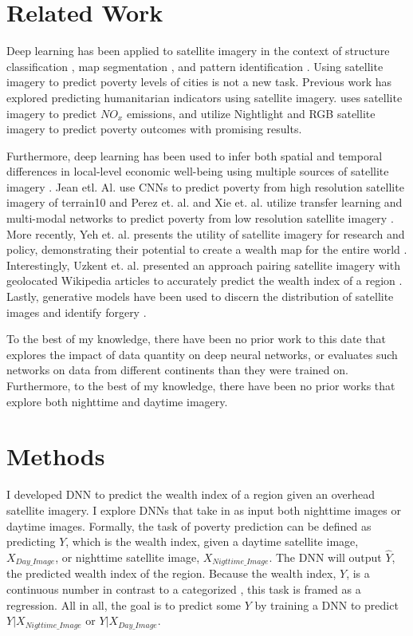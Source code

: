 \documentclass{article}
\begin{document}
\section{Related Work}

Deep learning has been applied to satellite imagery in the context of structure classification \cite{xia2018dota}, map segmentation \cite{wang2015deep} \cite{audebert2017joint}, and pattern identification \cite{albert2017using}. Using satellite imagery to predict poverty levels of cities is not a new task. Previous work has explored predicting humanitarian indicators using satellite imagery. \cite{kim2006satellite} uses satellite imagery to predict $NO_x$ emissions, and \cite{wang2012poverty} \cite{Jean790} \cite{nips_2017_workshop_stefano} utilize Nightlight and RGB satellite imagery to predict poverty outcomes with promising results.

Furthermore, deep learning has been used to infer both spatial and temporal differences in local-level economic well-being using multiple sources of satellite imagery \cite{three}. Jean etl. Al. use CNNs to predict poverty from high resolution satellite imagery of terrain10 and Perez et. al. and Xie et. al. utilize transfer learning and multi-modal networks to predict poverty from low resolution satellite imagery \cite{eleven, twelve}. More recently, Yeh et. al. presents the utility of satellite imagery for research and policy, demonstrating their potential to create a wealth map for the entire world \cite{three}. Interestingly, Uzkent et. al. presented an approach pairing satellite imagery with geolocated Wikipedia articles to accurately predict the wealth index of a region \cite{thirteen}. Lastly, generative models have been used to discern the distribution of satellite images and identify forgery \cite{fourteen}. 


To the best of my knowledge, there have been no prior work to this date that explores the impact of data quantity on deep neural networks, or evaluates such networks on data from different continents than they were trained on. Furthermore, to the best of my knowledge, there have been no prior works that explore both nighttime and daytime imagery.



\section{Methods}

I developed DNN to predict the wealth index of a region given an overhead satellite imagery. I explore DNNs that take in as input both nighttime images or daytime images. Formally, the task of poverty prediction can be defined as predicting $Y$, which is the wealth index, given a daytime satellite image, $X_{Day\_Image}$, or nighttime satellite image, $X_{Nigttime\_Image}$. The DNN will output $\hat{Y}$, the predicted wealth index of the region. Because the wealth index, $Y$, is a continuous number in contrast to a categorized , this task is framed as a regression. All in all, the goal is to predict some $Y$ by training a DNN to predict  $Y | X_{Nigttime\_Image}$ or  $Y | X_{Day\_Image}$.
\end{document}
